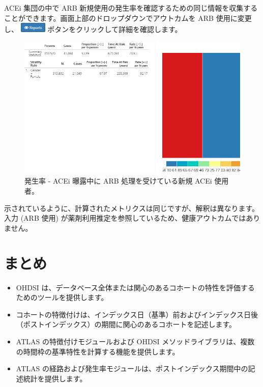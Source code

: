 \documentclass[
  11pt]{book}
\makeatletter
\newenvironment{kframe}{%
\medskip{}
\setlength{\fboxsep}{.8em}
 \def\at@end@of@kframe{}%
 \ifinner\ifhmode%
  \def\at@end@of@kframe{\end{minipage}}%
  \begin{minipage}{\columnwidth}%
 \fi\fi%
 \def\FrameCommand##1{\hskip\@totalleftmargin \hskip-\fboxsep
 \colorbox{myShadeColor}{##1}\hskip-\fboxsep
     \hskip-\linewidth \hskip-\@totalleftmargin \hskip\columnwidth}%
 \MakeFramed {\advance\hsize-\width
   \@totalleftmargin\z@ \linewidth\hsize
   \@setminipage}}%
 {\par\unskip\endMakeFramed%
 \at@end@of@kframe}
\newenvironment{rmdblock}[1]
  {
  \begin{itemize}
  \renewcommand{\labelitemi}{
    \raisebox{-.7\height}[0pt][0pt]{
      {\setkeys{Gin}{width=3em,keepaspectratio}\texttt{[image: images/\#1]}}
    }
  }
  \setlength{\fboxsep}{1em}
  \begin{kframe}
  \item
  }
  {
  \end{kframe}
  \end{itemize}
  }
\newenvironment{rmdsummary}
  {\begin{rmdblock}{summary}}
  {\end{rmdblock}}
\theoremstyle{definition}
\theoremstyle{definition}
\theoremstyle{definition}
\theoremstyle{definition}
\theoremstyle{remark}
\makeatother
\begin{document}
ACEi 集団の中で ARB 新規使用の発生率を確認するための同じ情報を収集することができます。画面上部のドロップダウンでアウトカムを ARB 使用に変更し、 \includegraphics{images/Characterization/atlasIncidenceReportButton.png} ボタンをクリックして詳細を確認します。

\begin{figure}

{\centering \includegraphics[width=1\linewidth]{images/Characterization/atlasIncidenceResultsARB} 

}

\caption{発生率 - ACEi 曝露中に ARB 処理を受けている新規 ACEi 使用者。}\label{fig:atlasIncidenceResultsARB}
\end{figure}

示されているように、計算されたメトリクスは同じですが、解釈は異なります。入力 (ARB 使用) が薬剤利用推定を参照しているため、健康アウトカムではありません。

\section{まとめ}\label{ux307eux3068ux3081-8}

\begin{rmdsummary}
\begin{itemize}
\item
  OHDSI は、データベース全体または関心のあるコホートの特性を評価するためのツールを提供します。
\item
  コホートの特徴付けは、インデックス日（基準）前およびインデックス日後（ポストインデックス）の期間に関心のあるコホートを記述します。
\item
  ATLAS の特徴付けモジュールおよび OHDSI メソッドライブラリは、複数の時間枠の基準特性を計算する機能を提供します。
\item
  ATLAS の経路および発生率モジュールは、ポストインデックス期間中の記述統計を提供します。
\end{itemize}
\end{rmdsummary}
\end{document}
